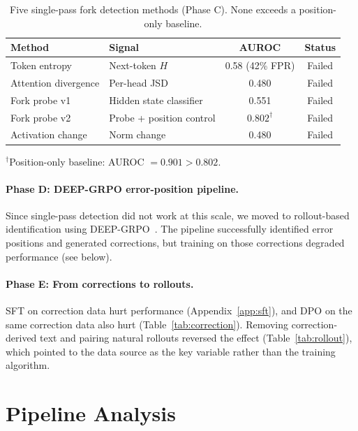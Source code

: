 \documentclass{article}
\begin{document}
\begin{table}[h]
    \centering
    \caption{Five single-pass fork detection methods (Phase C). None exceeds a position-only baseline.}
    \vspace{0.5em}
    \begin{tabular}{llcc}
        \toprule
        Method & Signal & AUROC & Status \\
        \midrule
        Token entropy & Next-token $H$ & 0.58 (42\% FPR) & Failed \\
        Attention divergence & Per-head JSD & 0.480 & Failed \\
        Fork probe v1 & Hidden state classifier & 0.551 & Failed \\
        Fork probe v2 & Probe + position control & $0.802^\dagger$ & Failed \\
        Activation change & Norm change & 0.480 & Failed \\
        \bottomrule
    \end{tabular}
    \label{tab:detection_app}
    \vspace{0.3em}
    {\small $^\dagger$Position-only baseline: AUROC $= 0.901 > 0.802$.}
\end{table}

\paragraph{Phase D: DEEP-GRPO error-position pipeline.}
Since single-pass detection did not work at this scale, we moved to rollout-based identification using DEEP-GRPO~\cite{deepgrpo2026}.
The pipeline successfully identified error positions and generated corrections, but training on those corrections degraded performance (see below).

\paragraph{Phase E: From corrections to rollouts.}
SFT on correction data hurt performance (Appendix~\ref{app:sft}), and DPO on the same correction data also hurt (Table~\ref{tab:correction}).
Removing correction-derived text and pairing natural rollouts reversed the effect (Table~\ref{tab:rollout}), which pointed to the data source as the key variable rather than the training algorithm.

\section{Pipeline Analysis}
\label{app:pipeline}
\end{document}
